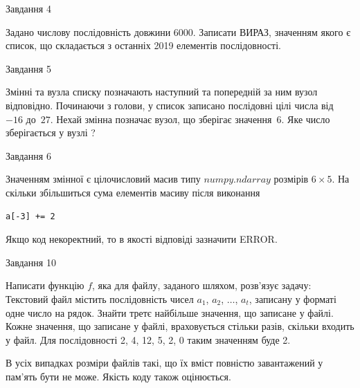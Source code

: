 \documentclass[12pt, ukrainian]{article}
\begin{document}
{               
{\begin{center}Завдання {4}\end{center}}
\vspace{-6mm}

 Задано числову послідовність  довжини 6000. Записати ВИРАЗ, значенням якого є список, що складається з останніх 2019 елементів послідовності.\par

\vspace{10mm}
               
{\begin{center}Завдання {5}\end{center}}
\vspace{-6mm}
Змінні  та  вузла списку позначають наступний та попередній за ним вузол відповідно. Починаючи з голови, у список записано послідовні цілі числа від~$-16$ до~$27$. Нехай змінна  позначає вузол, що зберігає значення~$6$.
Яке число зберігається у вузлі  ?\par

               
{\begin{center}Завдання {6}\end{center}}
\vspace{-6mm}
Значенням змінної  є цілочисловий масив типу $numpy.ndarray$ розмірів $6{\times}5$. На скільки збільшиться сума елементів масиву  після виконання
\begin{verbatim}
a[-3] += 2
\end{verbatim}


Якщо код некоректний, то в якості відповіді зазначити ERROR.\par

               
{\begin{center}Завдання {10}\end{center}}
\vspace{-6mm}

Написати функцію $f$, яка для файлу, заданого шляхом, розв’язує задачу:\\ Текстовий файл містить послідовність чисел $a_1$, $a_2$, $\ldots$, $a_t$, записану у форматі одне число на рядок. Знайти третє найбільше значення, що записане у файлі. Кожне значення, що записане у файлі, враховується стільки разів, скільки входить у файл. Для послідовності 2, 4, 12, 5, 2, 0 таким значенням буде 2.

В усіх випадках розміри файлів такі, що їх вміст повністю завантажений у пам'ять бути не може. Якість коду також оцінюється.



}
\end{document}
